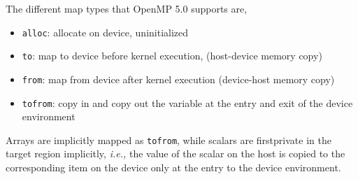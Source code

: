 The different map types that OpenMP 5.0 supports are, 
\begin{itemize}
 \item \texttt{alloc}: allocate on device, uninitialized
 \item \texttt{to}: map to device before kernel execution, (host-device memory copy)
 \item \texttt{from}:  map from device after kernel execution (device-host memory copy)
 \item \texttt{tofrom}: copy in and copy out the variable at the entry and exit of the device environment  
\end{itemize}
Arrays are implicitly mapped as \texttt{tofrom}, while scalars are firstprivate 
 in the target region implicitly, {\em i.e.,} the value of the scalar on the host
is copied to the corresponding item on the device only at the entry to the device
environment.
